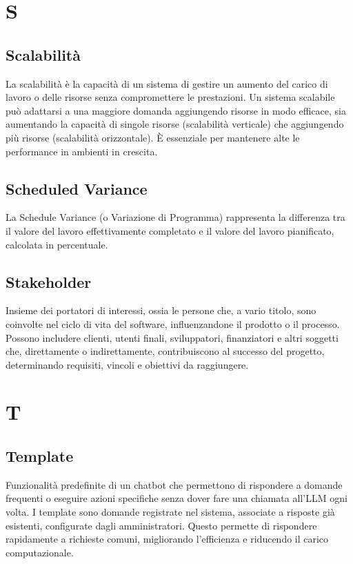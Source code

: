 \documentclass{article}
\begin{document}
\newpage
\section{S}

\subsection{Scalabilità}
La scalabilità è la capacità di un sistema di gestire un aumento del carico di lavoro o delle risorse senza compromettere le prestazioni. Un sistema scalabile può adattarsi a una maggiore domanda aggiungendo risorse in modo efficace, sia aumentando la capacità di singole risorse (scalabilità verticale) che aggiungendo più risorse (scalabilità orizzontale). È essenziale per mantenere alte le performance in ambienti in crescita.

\subsection{Scheduled Variance}
La Schedule Variance (o Variazione di Programma) rappresenta la differenza tra il valore del lavoro effettivamente completato e il valore del lavoro pianificato, calcolata in percentuale.

\subsection{Stakeholder}
Insieme dei portatori di interessi, ossia le persone che, a vario titolo, sono coinvolte nel ciclo di vita del software, influenzandone il prodotto o il processo. Possono includere clienti, utenti finali, sviluppatori, finanziatori e altri soggetti che, direttamente o indirettamente, contribuiscono al successo del progetto, determinando requisiti, vincoli e obiettivi da raggiungere.


\newpage
\section{T}

\subsection{Template}
Funzionalità predefinite di un chatbot che permettono di rispondere a domande frequenti o eseguire azioni specifiche senza dover fare una chiamata all'LLM ogni volta. I template sono domande registrate nel sistema, associate a risposte già esistenti, configurate dagli amministratori. Questo permette di rispondere rapidamente a richieste comuni, migliorando l'efficienza e riducendo il carico computazionale.
\end{document}
